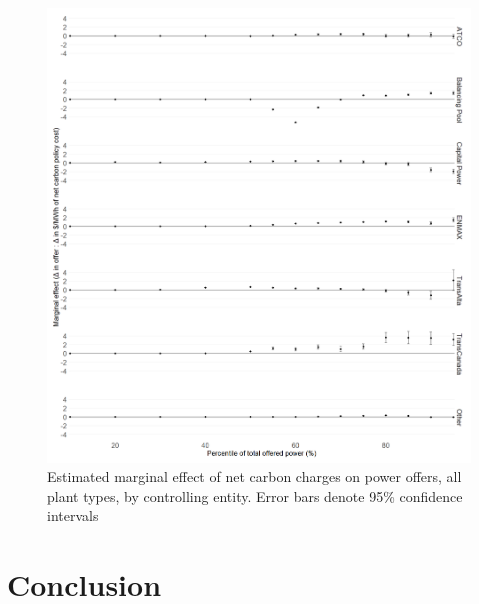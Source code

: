 \documentclass[12pt]{article}
\begin{document}
\begin{figure}[!htb]
    \centering
     \includegraphics[width=.9\textwidth]{../images/offer.png}
    \caption{Estimated marginal effect of net carbon charges on power offers, all plant types, by controlling entity. Error bars denote 95\% confidence intervals}
    \label{fig:offer}
\end{figure}


\section{Conclusion}




\end{document}
